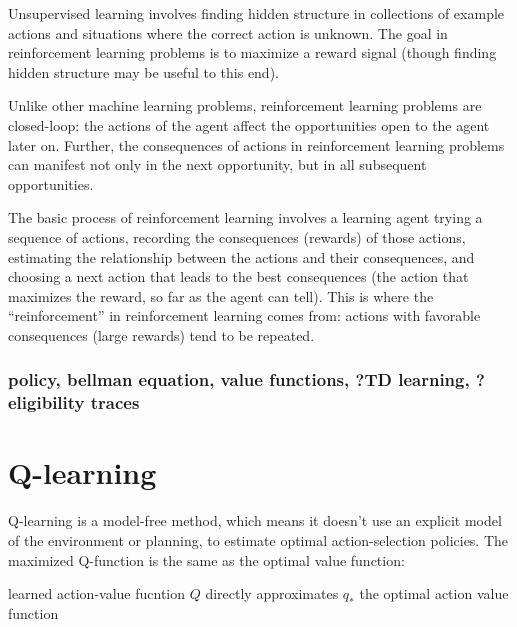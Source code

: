 \documentclass[12pt]{article}
\begin{document}
Unsupervised learning involves finding hidden structure in collections of example actions and situations where the correct action is unknown. The goal in reinforcement learning problems is to maximize a reward signal (though finding hidden structure may be useful to this end).

Unlike other machine learning problems, reinforcement learning problems are closed-loop: the actions of the agent affect the opportunities open to the agent later on. Further, the consequences of actions in reinforcement learning problems can manifest not only in the next opportunity, but in all subsequent opportunities.


The basic process of reinforcement learning involves a learning agent trying a sequence of actions, recording the consequences (rewards) of those actions, estimating the relationship between the actions and their consequences, and choosing a next action that leads to the best consequences (the action that maximizes the reward, so far as the agent can tell). This is where the ``reinforcement'' in reinforcement learning comes from: actions with favorable consequences (large rewards) tend to be repeated.


\subsubsection{policy, bellman equation, value functions, ?TD learning, ?eligibility traces} %
\label{ssub:policy_bellman_equation_value_functions_td_learning_eligibility_traces}



\section{Q-learning} %
\label{sec:q_learning}

Q-learning is a model-free method, which means it doesn't use an explicit model of the environment or planning, to estimate optimal action-selection policies. The maximized Q-function is the same as the optimal value function:

learned action-value fucntion $Q$ directly approximates $q_{*}$ the optimal action value function
\end{document}
